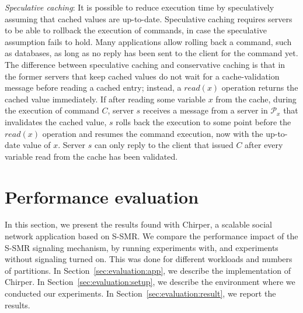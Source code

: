 \documentclass[11pt]{article}
\newcommand{\ppm}{\mathcal{P}}
\newcommand{\ssmr}{\mbox{S-SMR}}
\newcommand{\appname}{Chirper} %
\begin{document}
\emph{Speculative caching}: It is possible to reduce execution time by speculatively assuming that cached values are up-to-date. 
Speculative caching requires servers to be able to rollback the execution of commands, in case the speculative assumption fails to hold. 
Many applications allow rolling back a command, such as databases, as long as no reply has been sent to the client for the command yet. 
The difference between speculative caching and conservative caching is that in the former servers that keep cached values do not wait for a cache-validation message before reading a cached entry; instead, a $read(x)$ operation returns the cached value immediately. 
If after reading some variable $x$ from the cache, during the execution of command $C$, server $s$ receives a message from a server in $\ppm_x$ that invalidates the cached value, $s$ rolls back the execution to some point before the $read(x)$ operation and resumes the command execution, now with the up-to-date value of $x$. 
Server $s$ can only reply to the client that issued $C$ after every variable read from the cache has been validated.



\section{Performance evaluation}
In this section, we present the results found with \appname{}, a scalable social network application based on \ssmr{}.
We compare the performance impact of the \ssmr{} signaling mechanism, by running experiments with, and experiments without signaling turned on.
This was done for different workloads and numbers of partitions.
In Section~\ref{sec:evaluation:app}, we describe the implementation of \appname{}.
In Section~\ref{sec:evaluation:setup}, we describe the environment where we conducted our experiments.
In Section~\ref{sec:evaluation:result}, we report the results.
\end{document}

